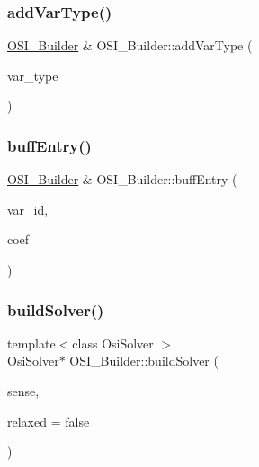 \subsubsection{\texorpdfstring{add\+Var\+Type()}{addVarType()}}
{\footnotesize\ttfamily \hyperlink{class_o_s_i___builder}{O\+S\+I\+\_\+\+Builder} \& O\+S\+I\+\_\+\+Builder\+::add\+Var\+Type (\begin{DoxyParamCaption}\item[{\hyperlink{class_o_s_i___builder_1_1_var_type}{Var\+Type} $\ast$}]{var\+\_\+type }\end{DoxyParamCaption})}

\mbox{\label{class_o_s_i___builder_adb96cad71e8d4ab93888969730fe5ad8}} 
\subsubsection{\texorpdfstring{buff\+Entry()}{buffEntry()}}
{\footnotesize\ttfamily \hyperlink{class_o_s_i___builder}{O\+S\+I\+\_\+\+Builder} \& O\+S\+I\+\_\+\+Builder\+::buff\+Entry (\begin{DoxyParamCaption}\item[{int}]{var\+\_\+id,  }\item[{double}]{coef }\end{DoxyParamCaption})}

\mbox{\label{class_o_s_i___builder_a25b48f1859bad98a9c1545d789e3310c}} 
\subsubsection{\texorpdfstring{build\+Solver()}{buildSolver()}}
{\footnotesize\ttfamily template$<$class Osi\+Solver $>$ \\
Osi\+Solver$\ast$ O\+S\+I\+\_\+\+Builder\+::build\+Solver (\begin{DoxyParamCaption}\item[{int}]{sense,  }\item[{bool}]{relaxed = {\ttfamily false} }\end{DoxyParamCaption})\hspace{0.3cm}{\ttfamily [inline]}}

